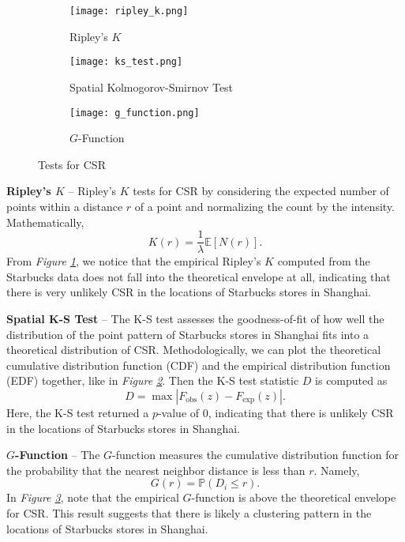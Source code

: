 \documentclass{article}
\begin{document}
\begin{figure}[htbp]
    \begin{subfigure}[b]{0.3\textwidth}
        \centering
        \texttt{[image: ripley\_k.png]}
        \caption{Ripley's \(K\)}
        \label{fig:ripley_k}
    \end{subfigure}
    \hfill
    \begin{subfigure}[b]{0.3\textwidth}
        \centering
        \texttt{[image: ks\_test.png]}
        \caption{Spatial Kolmogorov-Smirnov Test}
        \label{fig:ks_test}
    \end{subfigure}
    \hfill
    \begin{subfigure}[b]{0.3\textwidth}
        \centering
        \texttt{[image: g\_function.png]}
        \caption{\(G\)-Function}
        \label{fig:g_function}
    \end{subfigure}
    \caption{Tests for CSR}
    \label{fig:csr_tests}
\end{figure}

\textbf{Ripley's \(K\)} -- Ripley’s \(K\) tests for CSR by considering the expected number of points within a distance \(r\) of a point and normalizing the count by the intensity. Mathematically,
\[K(r) = \frac{1}{\lambda} \mathbb{E}[N(r)].\]
From \textit{Figure \ref{fig:ripley_k}}, we notice that the empirical Ripley's \(K\) computed from the Starbucks data does not fall into the theoretical envelope at all, indicating that there is very unlikely CSR in the locations of Starbucks stores in Shanghai.

\textbf{Spatial K-S Test} -- The K-S test assesses the goodness-of-fit of how well the distribution of the point pattern of Starbucks stores in Shanghai fits into a theoretical distribution of CSR. Methodologically, we can plot the theoretical cumulative distribution function (CDF) and the empirical distribution function (EDF) together, like in \textit{Figure \ref{fig:ks_test}}. Then the K-S test statistic \(D\) is computed as
\[D = \max |F_{\text{obs}}(z) - F_{\text{exp}}(z)|.\]
Here, the K-S test returned a \(p\)-value of 0, indicating that there is unlikely CSR in the locations of Starbucks stores in Shanghai.

\textbf{\(G\)-Function} -- The \(G\)-function measures the cumulative distribution function for the probability that the nearest neighbor distance is less than \(r\). Namely,
\[G(r) = \mathbb{P}(D_i \leq r).\]
In \textit{Figure \ref{fig:g_function}}, note that the empirical \(G\)-function is above the theoretical envelope for CSR. This result suggests that there is likely a clustering pattern in the locations of Starbucks stores in Shanghai.
\end{document}
